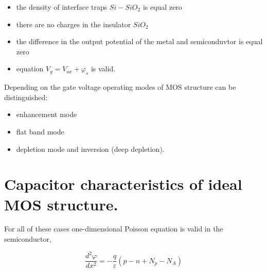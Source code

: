\begin{itemize}
\item the density of interface traps $Si-SiO_2$ is equal zero
\item there are no charges in the insulator $SiO_2$
\item the difference in the output potential of the metal and
  semiconduvtor is equal zero
\item equation $V_{g}=V_{ox}+\varphi_{s}$ is valid.
\end{itemize}

\iffalse
\noindent V závislosti od hradlového napätia možno rozlíšiť tieto
pracovné režimy štruktúry MOS:
\fi

\noindent Depending on the gate voltage operating modes of MOS
structure can be distinguished:

\iffalse
\begin{itemize}
\item režim obohatenia
\item stav vyrovnaných pásov
\item režim ochudobnenia a inverzie (hlbokého ochudobnenia).
\end{itemize}
\fi

\begin{itemize}
\item enhancement mode
\item flat band mode
\item depletion mode and inversion (deep depletion).
\end{itemize}

\iffalse
\section{Kapacitné závislosti ideálnej štruktúry MOS.}
Pre všetky uvedené prípady platí v polovodiči jednodimenzionálna
Poissonova rovnica
\fi

\section{Capacitor characteristics of ideal MOS structure.}
 For all of these cases one-dimensional
Poisson equation is valid in the semiconductor,

\begin{equation}\label{eq:1.2}
\frac{d^2\varphi}{dx^2}=-\frac{q}{\varepsilon}(p-n+N_{p}-N_{A})
\end{equation}

